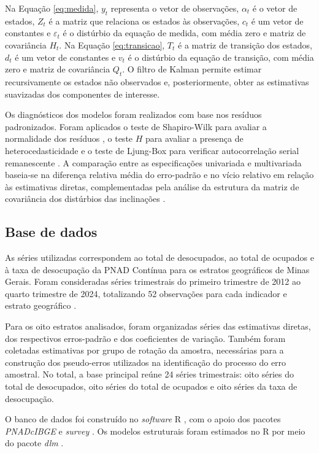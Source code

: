 \documentclass[rbe,wwwview]{econbr}
\begin{document}
\noindent
Na Equação \ref{eq:medida}, \(y_t\) representa o vetor de observações, \(\alpha_t\) é o vetor de estados, \(Z_t\) é a matriz que relaciona os estados às observações, \(c_t\) é um vetor de constantes e \(\varepsilon_t\) é o distúrbio da equação de medida, com média zero e matriz de covariância \(H_t\). Na Equação \ref{eq:transicao}, \(T_t\) é a matriz de transição dos estados, \(d_t\) é um vetor de constantes e \(v_t\) é o distúrbio da equação de transição, com média zero e matriz de covariância \(Q_t\). O filtro de Kalman permite estimar recursivamente os estados não observados e, posteriormente, obter as estimativas suavizadas dos componentes de interesse.

Os diagnósticos dos modelos foram realizados com base nos resíduos padronizados. Foram aplicados o teste de Shapiro-Wilk para avaliar a normalidade dos resíduos \citep{shapiro_wilk_1965}, o teste \(H\) para avaliar a presença de heterocedasticidade \citep{durbinkoop2012} e o teste de Ljung-Box para verificar autocorrelação serial remanescente \citep{ljung_box_1978}. A comparação entre as especificações univariada e multivariada baseia-se na diferença relativa média do erro-padrão e no vício relativo em relação às estimativas diretas, complementadas pela análise da estrutura da matriz de covariância dos distúrbios das inclinações \citep{durbinkoop2012,pelagatti2016}.

\subsection{Base de dados}
\label{subsec:base}

As séries utilizadas correspondem ao total de desocupados, ao total de ocupados e à taxa de desocupação da PNAD Contínua para os estratos geográficos de Minas Gerais. Foram consideradas séries trimestrais do primeiro trimestre de 2012 ao quarto trimestre de 2024, totalizando 52 observações para cada indicador e estrato geográfico \citep{ibge2025pnad}.

Para os oito estratos analisados, foram organizadas séries das estimativas diretas, dos respectivos erros-padrão e dos coeficientes de variação. Também foram coletadas estimativas por grupo de rotação da amostra, necessárias para a construção dos pseudo-erros utilizados na identificação do processo do erro amostral. No total, a base principal reúne 24 séries trimestrais: oito séries do total de desocupados, oito séries do total de ocupados e oito séries da taxa de desocupação.

O banco de dados foi construído no \textit{software} R \citep{R-base}, com o apoio dos pacotes \textit{PNADcIBGE} \citep{pacotepnad} e \textit{survey} \citep{survey}. Os modelos estruturais foram estimados no R por meio do pacote \textit{dlm} \citep{dlm}.
\end{document}
